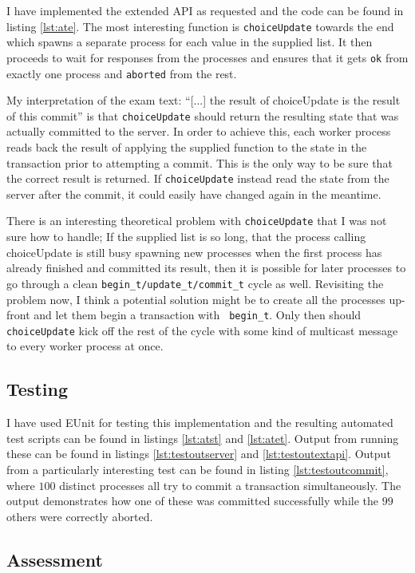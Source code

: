 \documentclass[
paper=a4,
oneside,
fontsize=11pt,
numbers=noenddot,
headinclude=false, %
footinclude=false, %
fleqn,             %
DIV=8
]{scrartcl}
\begin{document}
I have implemented the extended API as requested and the code can be found in
listing \ref{lst:ate}. The most interesting function is {\tt choiceUpdate}
towards the end which spawns a separate process for each value in the supplied
list. It then proceeds to wait for responses from the processes and ensures that
it gets {\tt ok} from exactly one process and {\tt aborted} from the rest.

My interpretation of the exam text: ``[...] the result of choiceUpdate is the
result of this commit'' is that {\tt choiceUpdate} should return the resulting
state that was actually committed to the server. In order to achieve this, each
worker process reads back the result of applying the supplied function to the
state in the transaction prior to attempting a commit. This is the only way to
be sure that the correct result is returned. If {\tt choiceUpdate} instead read
the state from the server after the commit, it could easily have changed again
in the meantime.

There is an interesting theoretical problem with {\tt choiceUpdate} that I was
not sure how to handle; If the supplied list is so long, that the process
calling choiceUpdate is still busy spawning new processes when the first process
has already finished and committed its result, then it is possible for later
processes to go through a clean {\tt begin\_t/update\_t/commit\_t} cycle as
well. Revisiting the problem now, I think a potential solution might be to
create all the processes up-front and let them begin a transaction with {\tt
  begin\_t}. Only then should {\tt choiceUpdate} kick off the rest of the cycle
with some kind of multicast message to every worker process at once.

\subsection{Testing}
\label{sec:testing-2}

I have used EUnit for testing this implementation and the resulting automated
test scripts can be found in listings \ref{lst:atst} and \ref{lst:atet}. Output
from running these can be found in listings \ref{lst:testoutserver} and
\ref{lst:testoutextapi}. Output from a particularly interesting test can be
found in listing \ref{lst:testoutcommit}, where $100$ distinct processes all try
to commit a transaction simultaneously. The output demonstrates how one of these
was committed successfully while the $99$ others were correctly aborted.

\subsection{Assessment}
\label{sec:assessment-2}
\end{document}
